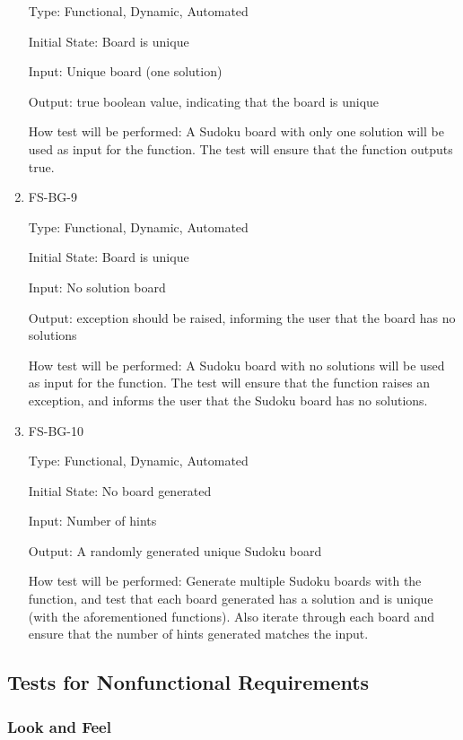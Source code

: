 \documentclass[11pt]{article}
\begin{document}
\begin{enumerate}
Type: Functional, Dynamic, Automated
					
Initial State: Board is unique
					
Input: Unique board (one solution)
					
Output: true boolean value, indicating that the board is unique
					
How test will be performed: A Sudoku board with only one solution will be used as input for the function. The test will ensure that the function outputs true.

\item{FS-BG-9\\}

Type: Functional, Dynamic, Automated
					
Initial State: Board is unique
					
Input: No solution board
					
Output: exception should be raised, informing the user that the board has no solutions
					
How test will be performed: A Sudoku board with no solutions will be used as input for the function. The test will ensure that the function raises an exception, and informs the user that the Sudoku board has no solutions.

\item{FS-BG-10\\}

Type: Functional, Dynamic, Automated
					
Initial State: No board generated
					
Input: Number of hints
					
Output: A randomly generated unique Sudoku board
					
How test will be performed: Generate multiple Sudoku boards with the function, and test that each board generated has a solution and is unique (with the aforementioned functions). Also iterate through each board and ensure that the number of hints generated matches the input. 

\end{enumerate}

\subsection{Tests for Nonfunctional Requirements}

\subsubsection{Look and Feel}
		
\end{document}
